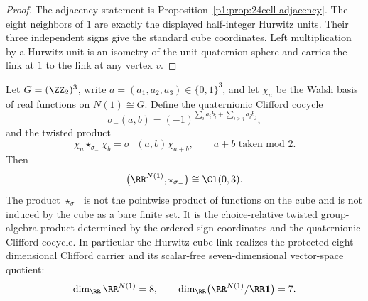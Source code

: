 \documentclass[11pt]{article}
\begin{document}
\begin{proof}
The adjacency statement is Proposition~\ref{p1:prop:24cell-adjacency}.  The eight
neighbors of \(1\) are exactly the displayed half-integer Hurwitz units.  Their
three independent signs give the standard cube coordinates.  Left multiplication
by a Hurwitz unit is an isometry of the unit-quaternion sphere and carries the
link at \(1\) to the link at any vertex \(v\).
\end{proof}

\begin{theorem}
\label{p1:thm:hurwitz-walsh-clifford}
Let \(G=(\ZZ_2)^3\), write \(a=(a_1,a_2,a_3)\in\{0,1\}^3\), and let
\(\chi_a\) be the Walsh basis of real functions on \(N(1)\cong G\).  Define the
quaternionic Clifford cocycle
\[
    \sigma_-(a,b)
    =(-1)^{\sum_i a_i b_i+\sum_{i>j}a_i b_j},
\]
and the twisted product
\[
    \chi_a\star_{\sigma_-}\chi_b=\sigma_-(a,b)\chi_{a+b},
    \qquad a+b\text{ taken mod }2.
\]
Then
\[
    \bigl(\RR^{N(1)},\star_{\sigma_-}\bigr)\cong \Cl(0,3).
\]
The product \(\star_{\sigma_-}\) is not the pointwise product of functions on the cube and is not induced by the cube as a bare finite set. It is the choice-relative twisted group-algebra product determined by the ordered sign coordinates and the quaternionic Clifford cocycle.
In particular the Hurwitz cube link realizes the protected eight-dimensional
Clifford carrier and its scalar-free seven-dimensional vector-space quotient:
\[
    \dim_\RR\RR^{N(1)}=8,
    \qquad
    \dim_\RR\bigl(\RR^{N(1)}/\RR\mathbf1\bigr)=7.
\]
\end{theorem}
\end{document}
